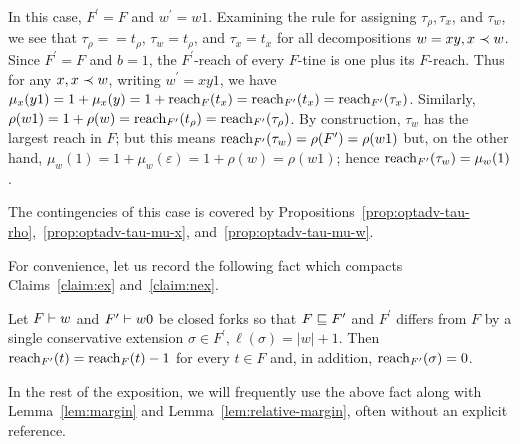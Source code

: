 	\begin{description}[font=\normalfont\itshape\space]
		\item[If $b = 1$.]
			In this case, $F^\prime = F$ and $w^\prime = w 1$. 
			Examining the rule for assigning $\tau_\rho, \tau_x$, and $\tau_w$, 
			we see that 
			$\tau_\rho = 
			= t_\rho$, 
			$\tau_w = t_\rho$, and 
			$\tau_x = t_x$ for all decompositions $w = xy, x \prec w$. 
			Since $F^\prime = F$ and $b = 1$, 
			the $F^\prime$-reach of every $F$-tine is one plus its $F$-reach. 
			Thus for any $x, x \prec w$, writing $w^\prime = xy1$, we have 
			$\mu_x(y1) 
			= 1 + \mu_x(y) 
			= 1 + \operatorname{reach}_F(t_x) 
			= \operatorname{reach}_{F^\prime}(t_x)
			= \operatorname{reach}_{F^\prime}(\tau_x)$.
			Similarly, 
			$\rho(w1) 
			= 1 + \rho(w) 
			= \operatorname{reach}_{F^\prime}(t_\rho)
			= \operatorname{reach}_{F^\prime}(\tau_\rho)
			$.
			By construction, 
			$\tau_w$ has the largest reach in $F$; 
			but this means $\operatorname{reach}_{F'}(\tau_w) = \rho(F') = \rho(w1)$ but, 
			on the other hand, $\mu_w(1) = 1 + \mu_w(\varepsilon) = 1 + \rho(w) = \rho(w1)$; 
			hence $\operatorname{reach}_{F^\prime}(\tau_w) = \mu_w(1)$. 

		\item[If $b = 0$.]
			The contingencies of this case 
			is covered by Propositions~\ref{prop:optadv-tau-rho},~\ref{prop:optadv-tau-mu-x}, and~\ref{prop:optadv-tau-mu-w}.

	\end{description}

	For convenience, let us record the following fact 
	which compacts Claims~\ref{claim:ex} and~\ref{claim:nex}.

	\begin{fact}\label{fact:reach-fork-ext}
		Let $F \vdash w$ and $F^\prime \vdash w0$ be closed forks so that 
		$F \sqsubseteq F^\prime$ and 
		$F^\prime$ differs from $F$ by a single conservative extension 
		$\sigma \in F^\prime, \ell(\sigma) = |w| + 1$.
		Then $\operatorname{reach}_{F^\prime}(t) = \operatorname{reach}_F(t) - 1$ for every $t \in F$ and,  
		in addition, $\operatorname{reach}_{F^\prime}(\sigma) = 0$.
	\end{fact}

	In the rest of the exposition, we will frequently use 
	the above fact along with Lemma~\ref{lem:margin} and Lemma~\ref{lem:relative-margin}, 
	often without an explicit reference.

